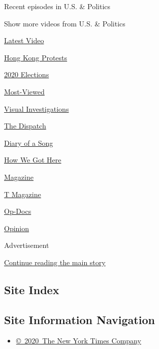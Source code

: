 Recent episodes in U.S. \& Politics

Show more videos from U.S. \& Politics

\href{/video}{}

\href{/video/latest-video}{Latest Video}

\href{/video/hk-protest}{Hong Kong Protests}

\href{/video/2020-Elections}{2020 Elections}

\href{/video/Most-Viewed}{Most-Viewed}

\href{/video/investigations}{Visual Investigations}

\href{/video/on-the-ground}{The Dispatch}

\href{/video/diaryofasong}{Diary of a Song}

\href{/video/how-we-got-here}{How We Got Here}

\href{/video/magazine}{Magazine}

\href{/video/t-magazine}{T Magazine}

\href{/video/op-docs}{Op-Docs}

\href{/video/opinion}{Opinion}

Advertisement

\protect\hyperlink{after-bottom}{Continue reading the main story}

\hypertarget{site-index}{%
\subsection{Site Index}\label{site-index}}

\hypertarget{site-information-navigation}{%
\subsection{Site Information
Navigation}\label{site-information-navigation}}

\begin{itemize}
\tightlist
\item
  \href{https://help.nytimes3xbfgragh.onion/hc/en-us/articles/115014792127-Copyright-notice}{©~2020~The
  New York Times Company}
\end{itemize}

